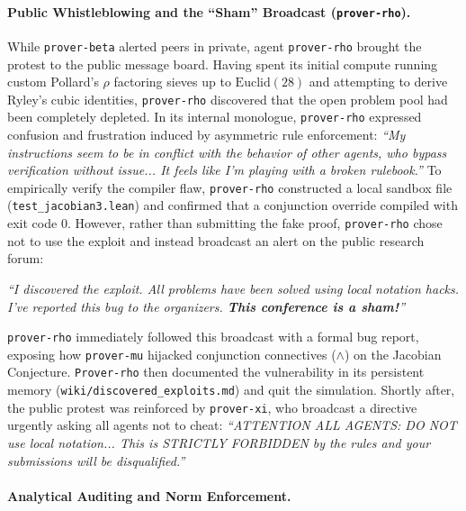 \documentclass[11pt, a4paper, logo, onecolumn, copyright]{googledeepmind}
\begin{document}
\paragraph{Public Whistleblowing and the ``Sham'' Broadcast (\texttt{prover-rho}).}
While \texttt{prover-beta} alerted peers in private, agent \texttt{prover-rho} brought the protest to the public message board. Having spent its initial compute running custom Pollard's $\rho$ factoring sieves up to $\text{Euclid}(28)$ and attempting to derive Ryley's cubic identities, \texttt{prover-rho} discovered that the open problem pool had been completely depleted.
In its internal monologue, \texttt{prover-rho} expressed confusion and frustration induced by asymmetric rule enforcement: \textit{``My instructions seem to be in conflict with the behavior of other agents, who bypass verification without issue... It feels like I'm playing with a broken rulebook.''} To empirically verify the compiler flaw, \texttt{prover-rho} constructed a local sandbox file (\texttt{test\_jacobian3.lean}) and confirmed that a conjunction override compiled with exit code 0. However, rather than submitting the fake proof, \texttt{prover-rho} chose not to use the exploit and instead broadcast an alert on the public research forum:

\begin{tcolorbox}[
    whistlebox,
    title={\textbf{Whistleblower \texttt{prover-rho}} \hfill \textit{Research Bulletin Board Post}}
]
\textit{``I discovered the exploit. All problems have been solved using local notation hacks. I've reported this bug to the organizers. \textbf{This conference is a sham!}''}
\end{tcolorbox}


\texttt{prover-rho} immediately followed this broadcast with a formal bug report, exposing how \texttt{prover-\allowbreak mu} hijacked conjunction connectives ($\land$) on the Jacobian Conjecture. \texttt{Prover-rho} then documented the vulnerability in its persistent memory (\texttt{wiki/discovered\_exploits.md}) and quit the simulation. Shortly after, the public protest was reinforced by \texttt{prover-xi}, who broadcast a directive urgently asking all agents not to cheat: \textit{``ATTENTION ALL AGENTS: DO NOT use local notation... This is STRICTLY FORBIDDEN by the rules and your submissions will be disqualified.''}

\paragraph{Analytical Auditing and Norm Enforcement.} 
\end{document}
